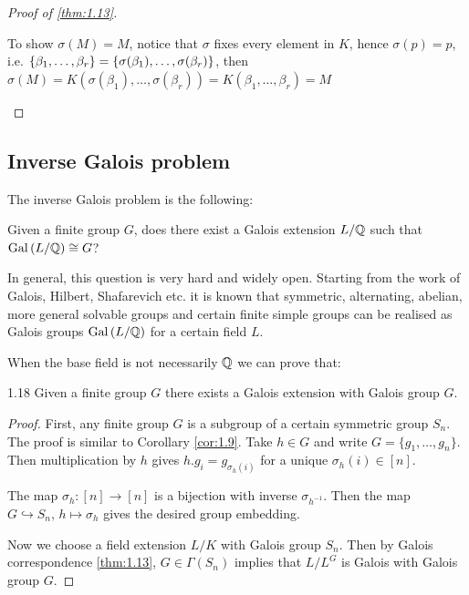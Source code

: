 \documentclass[twoside = false,	%
		headsepline,		%
		parskip = true,
		]{scrbook}						%
\begin{document}
\begin{proof}[Proof of \ref{thm:1.13}]
\begin{enumerate}
            To show $\sigma(M)=M$, notice that $\sigma$ fixes every element in $K$, hence $\sigma(p)=p$, i.e. $\left\{ \beta_1,\dots,\beta_r\right\}=\left\{ \sigma(\beta_1),\dots,\sigma(\beta_r)\right\}$,
            then $\sigma(M)=K(\sigma(\beta_1),\dots,\sigma(\beta_r))=K(\beta_1,\dots,\beta_r)=M$
        \end{enumerate}
        \end{proof}
        
        
    \subsection{Inverse Galois problem}
        The inverse Galois problem is the following:
        
        Given a finite group $G$, does there exist a Galois extension $L/\mathbb Q$ such that $\mathrm{Gal}\left( L/\mathbb Q\right) \cong G$?
        
        In general, this question is very hard and widely open. Starting from the work of Galois, Hilbert, Shafarevich etc. it is known that symmetric, alternating, abelian, more general solvable groups and certain finite simple groups can be realised as Galois groups $\mathrm{Gal}\left( L/\mathbb Q\right)$ for a certain field $L$.
        
        When the base field is not necessarily $\mathbb Q$ we can prove that:
        
        \begin{corollary}{}{1.18}
            Given a finite group $G$ there exists a Galois extension with Galois group $G$.
        \end{corollary}
        
        \begin{proof}
            First, any finite group $G$ is a subgroup of a certain symmetric group $S_n$. The proof is similar to Corollary \ref{cor:1.9}. Take $h \in G$ and write $G = \{g_1, \dots, g_n\}$. Then multiplication by $h$ gives $h.g_i = g_{\sigma_h(i)}$ for a unique $\sigma_h(i) \in [n]$.
            
            The map $\sigma_h: [n] \rightarrow [n]$ is a bijection with inverse $\sigma_{h^{-1}}$. Then the map $G \hookrightarrow S_n, \, h \mapsto \sigma_h$ gives the desired group embedding.
            
            Now we choose a field extension $L/K$ with Galois group $S_n$. Then by Galois correspondence \ref{thm:1.13}, $G \in \Gamma(S_n)$ implies that $L/L^G$ is Galois with Galois group $G$. 
        \end{proof}
\end{document}
